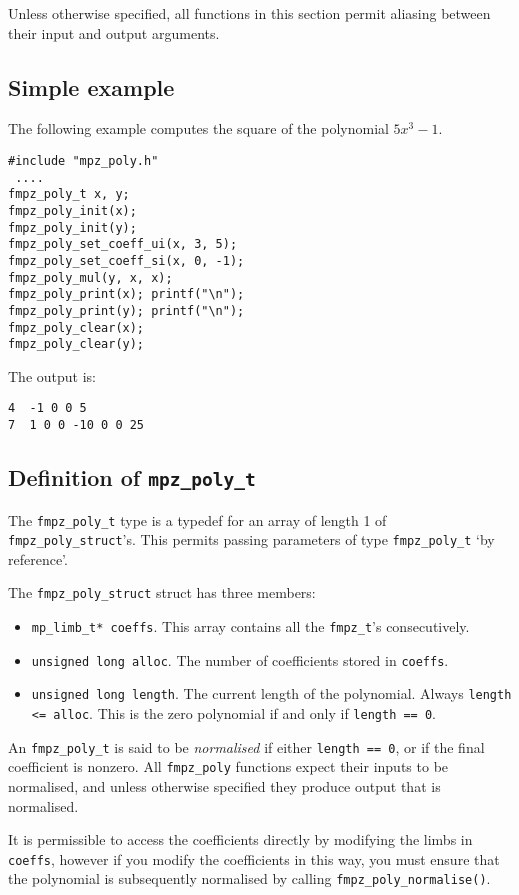\documentclass[a4paper,10pt]{article}
\newcommand{\code}{\lstinline}
\begin{document}
Unless otherwise specified, all functions in this section permit aliasing between their input and output arguments. 
\subsection{Simple example}

The following example computes the square of the polynomial $5x^3 - 1$.

\begin{lstlisting}
#include "mpz_poly.h"
 ....
fmpz_poly_t x, y;
fmpz_poly_init(x);
fmpz_poly_init(y);
fmpz_poly_set_coeff_ui(x, 3, 5);
fmpz_poly_set_coeff_si(x, 0, -1);
fmpz_poly_mul(y, x, x);
fmpz_poly_print(x); printf("\n");
fmpz_poly_print(y); printf("\n");
fmpz_poly_clear(x);
fmpz_poly_clear(y);
\end{lstlisting}

The output is:

\begin{lstlisting}
4  -1 0 0 5
7  1 0 0 -10 0 0 25
\end{lstlisting}

\subsection{Definition of \code{mpz_poly_t}}

The \code{fmpz_poly_t} type is a typedef for an array of length 1 of \code{fmpz_poly_struct}'s. This permits passing parameters  of type \code{fmpz_poly_t} `by reference'.

The \code{fmpz_poly_struct} struct has three members:
\begin{itemize}
\item \code{mp_limb_t* coeffs}. This array contains all the \code{fmpz_t}'s consecutively.
\item \code{unsigned long alloc}. The number of coefficients stored in \code{coeffs}.
\item \code{unsigned long length}. The current length of the polynomial. Always \code{length <= alloc}. This is the zero polynomial if and only if \code{length == 0}. 
\end{itemize}

An \code{fmpz_poly_t} is said to be \emph{normalised} if either \code{length == 0}, or if the final coefficient is nonzero. All \code{fmpz_poly} functions expect their inputs to be normalised, and unless otherwise specified they produce output that is normalised. 

It is permissible to access the coefficients directly by modifying the limbs in \code{coeffs}, however if you modify the coefficients in this way, you must ensure that the polynomial is subsequently normalised by calling \code{fmpz_poly_normalise()}.
\end{document}

